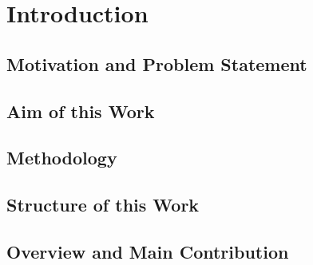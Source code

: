 



\chapter{Introduction}
\label{chap:intro}

\section{Motivation and Problem Statement}
\label{sec:motivation}


\section{Aim of this Work}
\label{sec:aim}

\section{Methodology} %
\label{sec:methodology}


\section{Structure of this Work}
\label{sec:structure}

\section{Overview and Main Contribution}
\label{sec:contribution}

